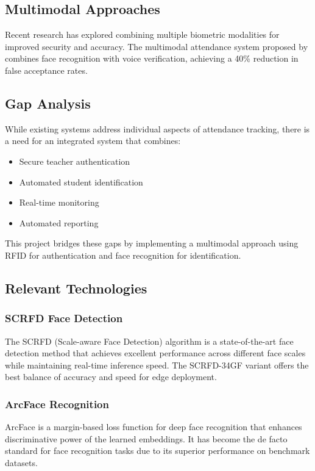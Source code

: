 \documentclass[12pt,a4paper]{article}
\begin{document}
\subsection{Multimodal Approaches}
Recent research has explored combining multiple biometric modalities for improved security and accuracy. The multimodal attendance system proposed by \cite{multimodal_attendance} combines face recognition with voice verification, achieving a 40\% reduction in false acceptance rates.

\subsection{Gap Analysis}
While existing systems address individual aspects of attendance tracking, there is a need for an integrated system that combines:
\begin{itemize}
	\item Secure teacher authentication
	\item Automated student identification
	\item Real-time monitoring
	\item Automated reporting
\end{itemize}

This project bridges these gaps by implementing a multimodal approach using RFID for authentication and face recognition for identification.

\subsection{Relevant Technologies}

\subsubsection{SCRFD Face Detection}
The SCRFD (Scale-aware Face Detection) algorithm \cite{scrfd} is a state-of-the-art face detection method that achieves excellent performance across different face scales while maintaining real-time inference speed. The SCRFD-34GF variant offers the best balance of accuracy and speed for edge deployment.

\subsubsection{ArcFace Recognition}
ArcFace \cite{arcface} is a margin-based loss function for deep face recognition that enhances discriminative power of the learned embeddings. It has become the de facto standard for face recognition tasks due to its superior performance on benchmark datasets.
\end{document}
